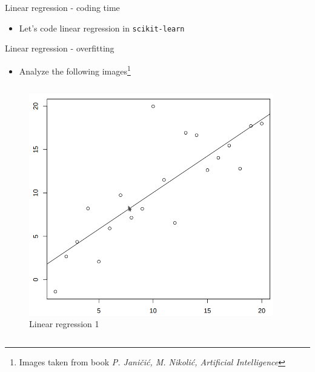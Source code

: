 \documentclass[aspectratio=169]{beamer}
\begin{document}
\begin{frame}{Linear regression - coding time}
    \begin{itemize}
        \item Let's code linear regression in \texttt{scikit-learn}
    \end{itemize}
\end{frame}
\begin{frame}{Linear regression - overfitting}
    \begin{itemize}
        \item Analyze the following images\footnote{Images taken from book \textit{P. Janičić, M. Nikolić, Artificial Intelligence}}
    \end{itemize}
    \begin{columns}
    \begin{column}{0.5\textwidth}
        \begin{center}
            \begin{figure}
                \includegraphics[scale=0.28]{./images/linreg.png}
                \caption{Linear regression 1}
            \end{figure}
        \end{center}
    \end{column}
    \begin{column}{0.5\textwidth}  %
        \begin{center}

\end{center}
\end{column}
\end{columns}
\end{frame}
\end{document}
